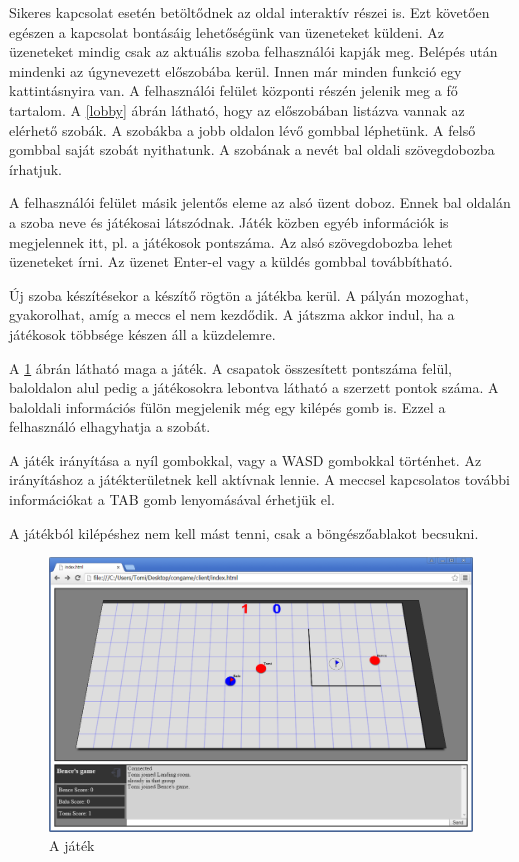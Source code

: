 \documentclass[bibliography=totocnumbered]{article}
\begin{document}
Sikeres kapcsolat esetén betöltődnek az oldal interaktív részei is. Ezt
követően egészen a kapcsolat bontásáig lehetőségünk van üzeneteket
küldeni. Az üzeneteket mindig csak az aktuális szoba felhasználói kapják
meg. Belépés után mindenki az úgynevezett előszobába kerül. Innen már
minden funkció egy kattintásnyira van. A felhasználói felület központi
részén jelenik meg a fő tartalom. A \ref{lobby} ábrán látható, hogy az
előszobában listázva vannak az elérhető szobák. A szobákba a jobb
oldalon lévő gombbal léphetünk. A felső gombbal saját szobát nyithatunk.
A szobának a nevét bal oldali szövegdobozba írhatjuk.

A felhasználói felület másik jelentős eleme az alsó üzent doboz. Ennek
bal oldalán a szoba neve és játékosai látszódnak. Játék közben egyéb
információk is megjelennek itt, pl. a játékosok pontszáma. Az alsó
szövegdobozba lehet üzeneteket írni. Az üzenet Enter-el vagy a küldés
gombbal továbbítható.

Új szoba készítésekor a készítő rögtön a játékba kerül. A pályán
mozoghat, gyakorolhat, amíg a meccs el nem kezdődik. A játszma akkor
indul, ha a játékosok többsége készen áll a küzdelemre.

A \ref{game} ábrán látható maga a játék. A csapatok összesített pontszáma
felül, baloldalon alul pedig a játékosokra lebontva látható a szerzett
pontok száma. A baloldali információs fülön megjelenik még egy kilépés
gomb is. Ezzel a felhasználó elhagyhatja a szobát.

A játék irányítása a nyíl gombokkal, vagy a WASD gombokkal történhet. Az
irányításhoz a játékterületnek kell aktívnak lennie. A meccsel
kapcsolatos további információkat a TAB gomb lenyomásával érhetjük el.

A játékból kilépéshez nem kell mást tenni, csak a böngészőablakot
becsukni.

\begin{figure}[ht]
	\caption{A játék}
	\label{game}
	\includegraphics[scale=0.385]{media/image11.png}
\end{figure}
\end{document}
